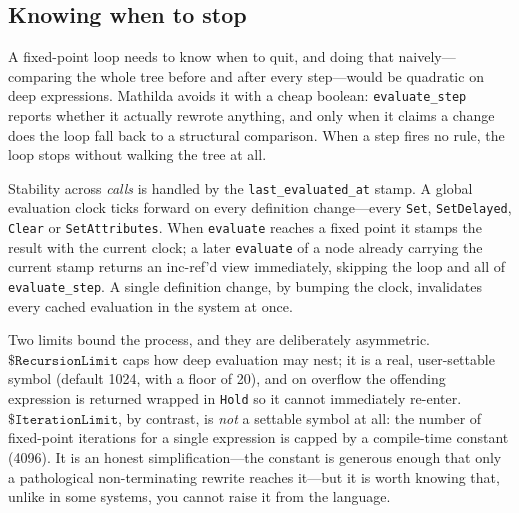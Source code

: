 \subsection*{Knowing when to stop}

A fixed-point loop needs to know when to quit, and doing that naively---comparing the
whole tree before and after every step---would be quadratic on deep expressions.
Mathilda avoids it with a cheap boolean: \texttt{evaluate\_step} reports whether it
actually rewrote anything, and only when it claims a change does the loop fall back to
a structural comparison. When a step fires no rule, the loop stops without walking the
tree at all.

Stability across \emph{calls} is handled by the \texttt{last\_evaluated\_at} stamp. A
global evaluation clock ticks forward on every definition change---every \texttt{Set},
\texttt{SetDelayed}, \texttt{Clear} or \texttt{SetAttributes}. When
\texttt{evaluate} reaches a fixed point it stamps the result with the current clock;
a later \texttt{evaluate} of a node already carrying the current stamp returns an
inc-ref'd view immediately, skipping the loop and all of \texttt{evaluate\_step}. A
single definition change, by bumping the clock, invalidates every cached evaluation in
the system at once.

Two limits bound the process, and they are deliberately asymmetric.
\(\mathtt{\$RecursionLimit}\) caps how deep evaluation may nest; it is a real,
user-settable symbol (default 1024, with a floor of 20), and on overflow the offending
expression is returned wrapped in \texttt{Hold} so it cannot immediately re-enter.
\(\mathtt{\$IterationLimit}\), by contrast, is \emph{not} a settable symbol at all: the
number of fixed-point iterations for a single expression is capped by a compile-time
constant (4096). It is an honest simplification---the constant is generous enough that
only a pathological non-terminating rewrite reaches it---but it is worth knowing that,
unlike in some systems, you cannot raise it from the language.

